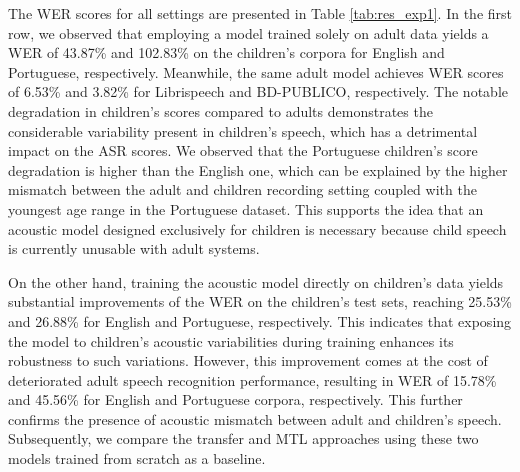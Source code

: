 




The \ac{WER} scores for all settings are presented in Table \ref{tab:res_exp1}. In the first row, we observed that employing a model trained solely on adult data yields a \ac{WER} of 43.87\% and 102.83\% on the children's corpora for English and Portuguese, respectively. Meanwhile, the same adult model achieves \ac{WER} scores of 6.53\% and 3.82\% for Librispeech and BD-PUBLICO, respectively. The notable degradation in children's scores compared to adults demonstrates the considerable variability present in children's speech, which has a detrimental impact on the \ac{ASR} scores. We observed that the Portuguese children's score degradation is higher than the English one, which can be explained by the higher mismatch between the adult and children recording setting coupled with the youngest age range in the Portuguese dataset. This supports the idea that an acoustic model designed exclusively for children is necessary because child speech is currently unusable with adult systems.

On the other hand, training the acoustic model directly on children's data yields substantial improvements of the \ac{WER} on the children's test sets, reaching 25.53\% and 26.88\% for English and Portuguese, respectively. This indicates that exposing the model to children's acoustic variabilities during training enhances its robustness to such variations. However, this improvement comes at the cost of deteriorated adult speech recognition performance, resulting in \ac{WER} of 15.78\% and 45.56\% for English and Portuguese corpora, respectively. This further confirms the presence of acoustic mismatch between adult and children's speech. Subsequently, we compare the transfer and \ac{MTL} approaches using these two models trained from scratch as a baseline.

